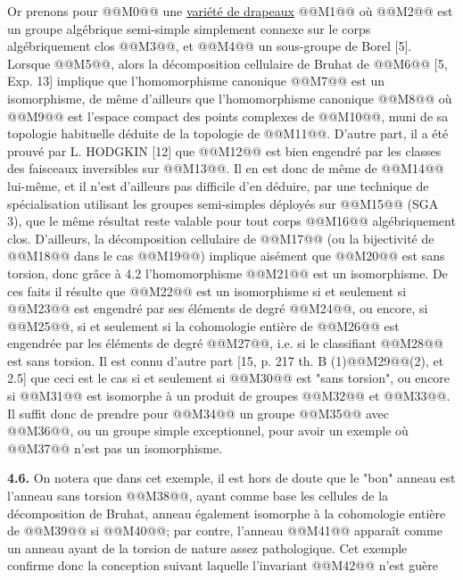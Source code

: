 
Or
prenons pour @@M0@@ une \uline{variété de drapeaux}
@@M1@@
où @@M2@@ est un groupe algébrique semi-simple simplement connexe sur le corps algébriquement clos @@M3@@, et @@M4@@ un sous-groupe de Borel [5]. Lorsque @@M5@@, alors la décomposition cellulaire de Bruhat de @@M6@@ [5, Exp. 13] implique que l'homomorphisme canonique
@@M7@@
est un isomorphisme, de même d'ailleurs que l'homomorphisme canonique
@@M8@@
où @@M9@@ est l'espace compact des points complexes de @@M10@@, muni de sa topologie habituelle déduite de la topologie de @@M11@@. D'autre part, il a été prouvé par L. HODGKIN [12] que @@M12@@ est bien engendré par les classes des faisceaux inversibles sur @@M13@@. Il en est donc de même de @@M14@@ lui-même, et il n'est d'ailleurs pas difficile d'en déduire, par une technique de spécialisation utilisant les groupes semi-simples déployés sur @@M15@@ (SGA 3), que le même résultat reste valable pour tout corps @@M16@@ algébriquement clos. D'ailleurs, la décomposition cellulaire de @@M17@@ (ou la bijectivité de @@M18@@ dans le cas @@M19@@) implique aisément que @@M20@@ est sans torsion, donc grâce à 4.2 l'homomorphisme @@M21@@ est un isomorphisme. De ces faits il résulte que @@M22@@ est un isomorphisme si et seulement si @@M23@@ est engendré par ses éléments de degré @@M24@@, ou encore, si @@M25@@, si et seulement si la cohomologie entière de @@M26@@ est engendrée par les éléments de degré @@M27@@, i.e. si le classifiant @@M28@@ est sans torsion. Il est connu d'autre part [15, p. 217 th. B (1)@@M29@@(2), et 2.5] que ceci est le cas si et seulement si @@M30@@ est "sans torsion", ou encore si @@M31@@ est isomorphe à un produit de groupes @@M32@@ et @@M33@@. Il suffit donc de prendre pour @@M34@@ un groupe @@M35@@ avec @@M36@@, ou un groupe simple exceptionnel, pour avoir un exemple où @@M37@@ n'est pas un isomorphisme.

\textbf{4.6.} On notera que dans cet exemple, il est hors de doute que le "bon" anneau est l'anneau sans torsion @@M38@@, ayant comme base les cellules de la décomposition de Bruhat, anneau également isomorphe à la cohomologie entière de @@M39@@ si @@M40@@; par contre, l'anneau @@M41@@ apparaît comme un anneau ayant de la torsion de nature assez pathologique. Cet exemple confirme donc la conception suivant laquelle l'invariant @@M42@@ n'est guère

